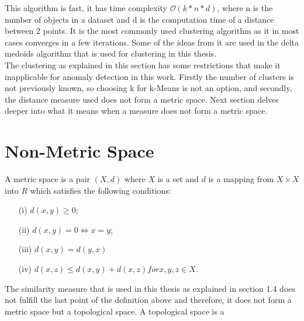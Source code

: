 \documentclass[thesis=B,english]{FITthesis}[2012/10/20]
\begin{document}
This algorithm is fast, it has time complexity $\mathcal{O}(k*n*d)$, where n is the number of objects in a dataset and d is the computation time of a distance between 2 points.
It is the most commonly used clustering algorithm as it in most cases converges in a few iterations.
Some of the ideas from it are used in the delta medoids algorithm that is used for clustering in this thesis. \\
                                                                                  
The clustering as explained in this section has some restrictions that make it inapplicable for anomaly detection in this work.
Firstly the number of clusters is not previously known, so choosing k for k-Means is not an option, and secondly, the distance measure used does not form a metric space.
Next section delves deeper into what it means when a measure does not form a metric space.
                                                                                  
\section{Non-Metric Space}                       
A metric space is a pair $(X, d)$ where $X$ is a set and $d$ is a mapping from $X \times X$ into $R$ which satisfies the following conditions:
\begin{enumerate}                                                                 
    \item [(i)] $d(x, y) \geq 0$;                                                 
    \item [(ii)] $d(x, y) = 0 \iff x = y$;                                        
    \item [(iii)] $d(x, y) = d(y, x)$                                             
    \item [(iv)] $d(x, z) \leq d(x, y) + d(x, z) for x, y, z \in X$.              
\end{enumerate}                                                                   
                                                                                  
The similarity measure that is used in this thesis as explained in section 1.4  does not fulfill the last point of the definition above and therefore, it does not form a metric space but a topological space.
A topological space is a 
\end{document}
